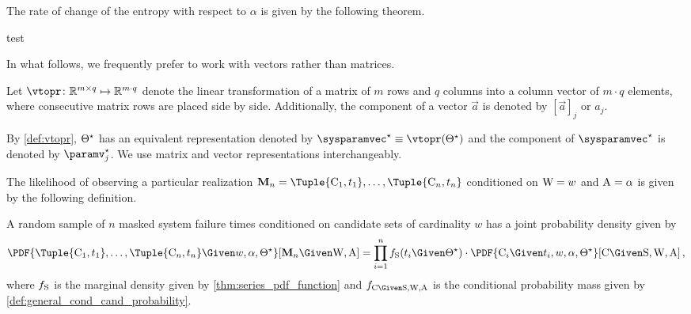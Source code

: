 \documentclass[../main.tex]{subfiles}
\begin{document}
The rate of change of the entropy with respect to $\alpha$ is given by the following theorem.
\begin{theorem}
	test
\end{theorem}



In what follows, we frequently prefer to work with vectors rather than matrices.
\begin{definition}
\label{def:vtopr}
Let $\vtopr \colon \mathbb{R}^{m \times q} \mapsto \mathbb{R}^{m \cdot q}$ denote the linear transformation of a matrix of $m$ rows and $q$ columns into a column vector of $m \cdot q$ elements, where consecutive matrix rows are placed side by side.
Additionally, the \jth component of a vector $\vec{a}$ is denoted by $\left[\vec{a}\right]_j$ or $a_j$.
\end{definition}
\begin{notation}
By \cref{def:vtopr}, ${\Theta}^{\star}$ has an equivalent representation denoted by $\tparam\sysparamvec \equiv \vtopr\!\left(\tparam\sysparam\right)$ and the \jth component of $\tparam\sysparamvec$ is denoted by $\tparam\paramv_j$.
We use matrix and vector representations interchangeably.
\end{notation}







The likelihood of observing a particular realization $\mfs = \Tuple{\cand_1,t_1},\ldots,\Tuple{\cand_n,t_n}$ conditioned on $\mathrm{W} = w$ and $\mathrm{A} = \alpha$ is given by the following definition.
\begin{definition}
	\label{def:msft_joint_pdf}
	A random sample of $n$ masked system failure times conditioned on candidate sets of cardinality $w$ has a joint probability density given by
	\begin{equation}
	\label{eq:msft_joint_pdf}
	\PDF{\Tuple{\cand_1,t_1},\ldots,\Tuple{\cand_n,t_n} \Given w, \alpha, \tparam{\sysparam}}[\mfs \Given \RV{W}, \RV{A}] =
	\prod_{i=1}^{n} \spdf(t_i \Given \tparam\sysparam) \cdot \PDF{\cand_i \Given t_i, w, \alpha, \tparam\sysparam}[\rvcand \Given \sv, \RV{W}, \RV{A}]\,,
	\end{equation}
	where $f_{\mathrm{S}}$ is the marginal density given by \cref{thm:series_pdf_function} and $\pdf_{\rvcand \Given \sv, \RV{W}, \RV{A}}$ is the conditional probability mass given by \cref{def:general_cond_cand_probability}.
\end{definition}
\end{document}
